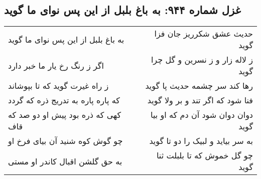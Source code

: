 \begin{center}
\section*{غزل شماره ۹۴۴: به باغ بلبل از این پس نوای ما گوید}
\label{sec:0944}
\begin{longtable}{l p{0.5cm} r}
به باغ بلبل از این پس نوای ما گوید
&&
حدیث عشق شکرریز جان فزا گوید
\\
اگر ز رنگ رخ یار ما خبر دارد
&&
ز لاله زار و ز نسرین و گل چرا گوید
\\
ز راه غیرت گوید که تا بپوشاند
&&
رها کند سر چشمه حدیث پا گوید
\\
که پاره پاره به تدریج ذره که گردد
&&
فنا شود که اگر تند و بر ولا گوید
\\
کهی که ذره بود پیش او دو صد که قاف
&&
دوان دوان شود آن دم که او بیا گوید
\\
چو گوش کوه شنید آن بیای فرخ او
&&
به سر بیاید و لبیک را دو تا گوید
\\
به حق گلشن اقبال کاندر او مستی
&&
چو گل خموش که تا بلبلت ثنا گوید
\\
\end{longtable}
\end{center}
